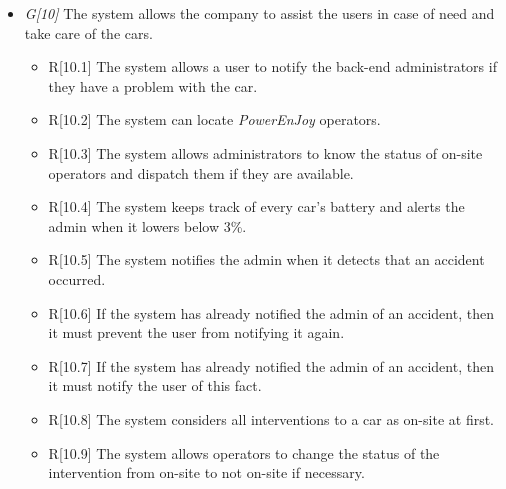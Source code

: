 \begin{itemize}
				\item \textit{G[10]} The system allows the company to assist the users in case of need and take care of the cars.	
					\begin{itemize}
						\item R[10.1] The system allows a user to notify the back-end administrators if they have a problem with the car.
						\item R[10.2] The system can locate \textit{PowerEnJoy} operators. 
						\item R[10.3] The system allows administrators to know the status of on-site operators and dispatch them if they are available.
						\item R[10.4] The system keeps track of every car's battery and alerts the admin when it lowers below 3\%. 
						\item R[10.5] The system notifies the admin when it detects that an accident occurred. 
						\item R[10.6] If the system has already notified the admin of an accident, then it must prevent the user from notifying it again.
						\item R[10.7] If the system has already notified the admin of an accident, then it must notify the user of this fact.
						\item R[10.8] The system considers all interventions to a car as on-site at first.
						\item R[10.9] The system allows operators to change the status of the intervention from on-site to not on-site if necessary.
					\end{itemize}
					

\end{itemize}
